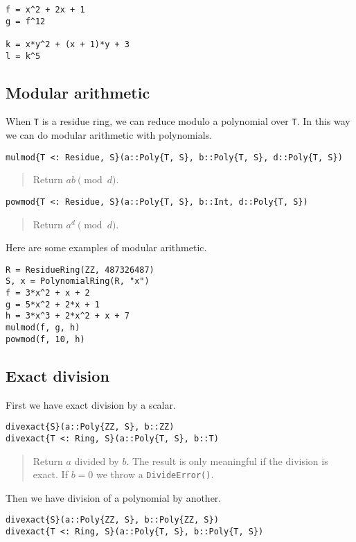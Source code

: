 \documentclass[a4paper,10pt]{article}
\newcommand{\code}{\lstinline}
\newcommand{\desc}[1]{\vspace{-3mm}\begin{quote}#1\end{quote}}
\begin{document}
{{{{{{\begin{lstlisting}
f = x^2 + 2x + 1
g = f^12

k = x*y^2 + (x + 1)*y + 3
l = k^5
\end{lstlisting}

\subsection{Modular arithmetic}

When \code{T} is a residue ring, we can reduce modulo a polynomial over
\code{T}. In this way we can do modular arithmetic with polynomials.

\begin{lstlisting}
mulmod{T <: Residue, S}(a::Poly{T, S}, b::Poly{T, S}, d::Poly{T, S})
\end{lstlisting}

\desc{Return $ab \pmod{d}$.}

\begin{lstlisting}
powmod{T <: Residue, S}(a::Poly{T, S}, b::Int, d::Poly{T, S})
\end{lstlisting}

\desc{Return $a^d \pmod{d}$.}

Here are some examples of modular arithmetic.

\begin{lstlisting}
R = ResidueRing(ZZ, 487326487)
S, x = PolynomialRing(R, "x")
f = 3*x^2 + x + 2
g = 5*x^2 + 2*x + 1
h = 3*x^3 + 2*x^2 + x + 7
mulmod(f, g, h)
powmod(f, 10, h)
\end{lstlisting}

\subsection{Exact division}

First we have exact division by a scalar.

\begin{lstlisting}
divexact{S}(a::Poly{ZZ, S}, b::ZZ)
divexact{T <: Ring, S}(a::Poly{T, S}, b::T)
\end{lstlisting}

\desc{Return $a$ divided by $b$. The result is only meaningful if the division is
exact. If $b = 0$ we throw a \code{DivideError()}.}

Then we have division of a polynomial by another.

\begin{lstlisting}
divexact{S}(a::Poly{ZZ, S}, b::Poly{ZZ, S})
divexact{T <: Ring, S}(a::Poly{T, S}, b::Poly{T, S})
\end{lstlisting}

}}}}}}
\end{document}
